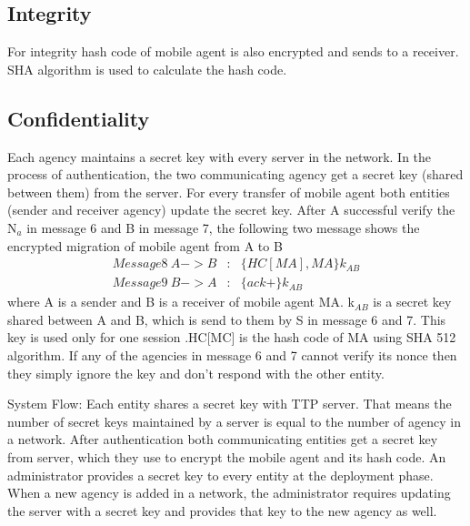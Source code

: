 \documentclass[letterpaper]{article}
\begin{document}
\subsection{Integrity}
For integrity hash code of mobile agent is also encrypted and sends to a
receiver. SHA algorithm is used to calculate the hash code.

\subsection{Confidentiality}
Each agency maintains a secret key with every server in the network. In the
process of authentication, the two communicating agency get a secret key (shared
between them) from the server. For every transfer of mobile agent both entities 
(sender and receiver agency) update the secret key. After A successful verify 
the N$_a$ in message 6 and B in message 7, the following two message shows the encrypted
migration of mobile agent from A to B 
\begin{eqnarray*}
Message 8  ~ A -> B&:& \{ HC[MA], MA\}k_{AB} \\
Message 9  ~ B -> A&:& \{ack+\}k_{AB}
\end{eqnarray*}
where A is a sender and B is a receiver of mobile agent MA. k$_{AB}$ is a secret key
shared between A and B, which is send to them by S in message 6 and 7. This key is 
used only for one session .HC[MC] is the hash code of MA using SHA 512 algorithm. 
If any of the agencies in message 6 and 7 cannot verify its nonce then they simply 
ignore the key and don’t respond with the other entity. 

System Flow:
Each entity shares a secret key with TTP server. That means the number of secret keys 
maintained by a server is equal to the number of agency in a network. After 
authentication both communicating entities get a secret key from server, which they 
use to encrypt the mobile agent and its hash code. 
An administrator provides a secret key to every entity at the deployment phase. When 
a new agency is added in a network, the administrator requires updating the server 
with a secret key and provides that key to the new agency as well.\\
\end{document}
